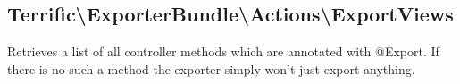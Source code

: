 \noindent \begin{minipage}{\textwidth}
\vspace{1.5em}
\hypertarget{sec-Actions-ExportViews}{\subsection{Terrific\textnormal{\textbackslash}ExporterBundle\textnormal{\textbackslash}Actions\textnormal{\textbackslash}ExportViews}}
Retrieves a list of all controller methods which are annotated with @Export. If there is no such a method the exporter simply won't just export anything.
\end{minipage}